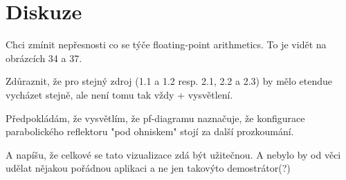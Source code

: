 \chapter{Diskuze}


Chci zmínit nepřesnosti co se týče floating-point arithmetics. To je vidět na obrázcích 34 a 37.

Zdůraznit, že pro stejný zdroj (1.1 a 1.2 resp. 2.1, 2.2 a 2.3) by mělo etendue vycházet stejně, ale není tomu tak vždy + vysvětlení.

Předpokládám, že vysvětlím, že pf-diagramu naznačuje, že konfigurace parabolického reflektoru "pod ohniskem" stojí za další prozkoumání.

A napíšu, že celkové se tato vizualizace zdá být užitečnou. A nebylo by od věci udělat nějakou pořádnou aplikaci a ne jen takovýto demostrátor(?)
